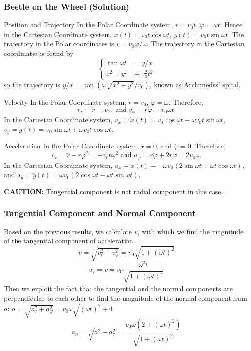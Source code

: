 \begin{frame}
\frametitle{Beetle on the Wheel (Solution)}
\begin{block}{Position and Trajectory}
In the \alert{Polar} Coordinate system, $r=v_0 t$, $\varphi=\omega t$. Hence in the \alert{Cartesian} Coordinate system, $x(t)=v_0 t\cos\omega t$, $y(t)=v_0 t\sin\omega t$. The \alert{trajectory} in the Polar coordinates is $r=v_0\varphi/\omega$. The \alert{trajectory} in the Cartesian coordinates is found by \[\begin{cases}\tan\omega t&=y/x\\x^2+y^2&=v_0^2 t^2\end{cases}\]
so the trajectory is $y/x=\tan(\omega\sqrt{x^2+y^2}/v_0)$, known as \alert{Archimedes' spiral.}
\end{block}
\end{frame}
\begin{frame}
\begin{block}{Velocity}
In the \alert{Polar} Coordinate system, $\dot r=v_0$, $\dot\varphi=\omega $. Therefore, \[v_{r}=\dot r=v_0,\text{ and }v_\varphi=r\dot\varphi=v_0\omega t.\]In the \alert{Cartesian} Coordinate system, $v_x=\dot x(t)=v_0 \cos\omega t-\omega v_0 t\sin\omega t$, $v_y=\dot y(t)=v_0 \sin\omega t+\omega v_0 t\cos\omega t$.
\end{block}
\begin{block}{Acceleration}
In the \alert{Polar} Coordinate system, $\ddot r=0$, and $\ddot \varphi=0$. Therefore,
\[
a_r=\ddot r-r\dot\varphi^2=-v_0t\omega^2\text{ and }a_\varphi=r\ddot\varphi+2\dot r\dot\varphi=2v_0\omega.
\]
In the \alert{Cartesian} Coordinate system, $a_x=\ddot x(t)=-\omega v_0(2\sin\omega t+\omega t\cos\omega t)$, and $a_y=\ddot y(t)=\omega v_0(2\cos\omega t-\omega t\sin\omega t)$.
\end{block}
\textbf{CAUTION:} \alert{Tangential} component is not \alert{radial} component in this case.
\end{frame}
\begin{frame}
\frametitle{Tangential Component and Normal Component}
Based on the previous results, we calculate $v$, with which we find the \alert{magnitude} of the tangential component of acceleration.
\[v=\sqrt{v_r^2+v_\varphi^2}=v_0\sqrt{1+(\omega t)^2}\]
\[
a_\tau=\dot v=v_0\frac{\omega^2 t}{\sqrt{1+(\omega t)^2}}
\]Then we exploit the fact that the tangential and the normal components are \alert{perpendicular} to each other to find the \alert{magnitude} of the normal component from $a$:\quad
$a=\sqrt{a_r^2+a_\varphi^2}=v_0 \omega\sqrt{(\omega t)^2+4}$
\[
a_n=\sqrt{a^2-a_\tau^2}=\frac{v_0 \omega (2+(\omega t)^2)}{\sqrt{1+(\omega t)^2 }}
\]
\end{frame}
